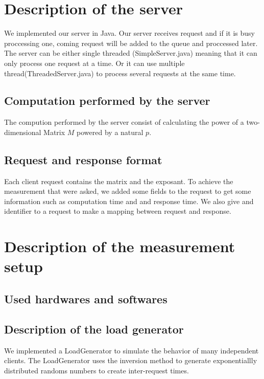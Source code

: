 \section{Description of the server}
\label{sec:Description of the server}
We implemented our server in Java. Our server receives request and if it is busy proccessing one,
coming request will be added to the queue and proccessed later. The server can be either
single threaded (SimpleServer.java) meaning that it can only process one request at a time. Or
it can use multiple thread(ThreadedServer.java) to process several requests at the same time.
 
\subsection{Computation performed by the server}
\label{sub:Computation performed by the server}
The compution performed by the server consist of calculating the power of a 
two-dimensional Matrix $M$ powered by a natural $p$.
\subsection{Request and response format}
Each client request contains the matrix and the exposant. To achieve the 
measurement that were asked, we added some fields to the request to get 
some information such as computation time and and response time. We also
give and identifier to a request to make a mapping between request and response. 
\label{sub:Request and response format}

\section{Description of the measurement setup}
\label{sec:Description of the measurement setup}

\subsection{Used hardwares and softwares}
\label{sub:Used hardwares and softwares}

\subsection{Description of the load generator}
\label{sub:Description of the load generator}
We implemented a LoadGenerator to simulate the behavior of many independent
clients. The LoadGenerator uses the inversion method to generate exponentiallly
distributed randoms numbers to create inter-request times.

